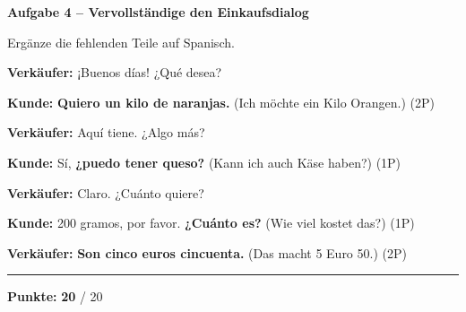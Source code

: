 \documentclass[11pt, a4paper]{article}
\newcommand{\fachfarbe}{spanisch}
\newcommand{\maxpunkte}{20}
\newcommand{\punktebox}[1]{\hfill\fbox{\small \_/#1}}
\newcommand{\lsg}[1]{\textcolor{loesung}{\textbf{#1}}}
\newenvironment{aufgabe}[1]{%
    \needspace{5\baselineskip}%
    \nopagebreak[4]%
    \vspace{10pt}
    \noindent\textbf{\textcolor{\fachfarbe}{Aufgabe #1}}
    \nopagebreak[4]%
    \vspace{5pt}
    \nopagebreak[4]%
    \begin{list}{}{\leftmargin=0pt}
    \item[]
}{%
    \end{list}
}
\begin{document}
\vspace{15pt}

\begin{aufgabe}{4 -- Vervollständige den Einkaufsdialog}
Ergänze die fehlenden Teile auf Spanisch. \punktebox{6}
\end{aufgabe}

\noindent
\textbf{Verkäufer:} ¡Buenos días! ¿Qué desea?

\vspace{0.8em}

\noindent
\textbf{Kunde:} \lsg{Quiero un kilo de naranjas.} (Ich möchte ein Kilo Orangen.) \hfill (2P)

\vspace{0.8em}

\noindent
\textbf{Verkäufer:} Aquí tiene. ¿Algo más?

\vspace{0.8em}

\noindent
\textbf{Kunde:} Sí, \lsg{¿puedo tener queso?} (Kann ich auch Käse haben?) \hfill (1P)

\vspace{0.8em}

\noindent
\textbf{Verkäufer:} Claro. ¿Cuánto quiere?

\vspace{0.8em}

\noindent
\textbf{Kunde:} 200 gramos, por favor. \lsg{¿Cuánto es?} (Wie viel kostet das?) \hfill (1P)

\vspace{0.8em}

\noindent
\textbf{Verkäufer:} \lsg{Son cinco euros cincuenta.} (Das macht 5 Euro 50.) \hfill (2P)


\vspace{20pt}
\hrule
\vspace{10pt}

\begin{flushright}
\textbf{Punkte:} \lsg{20} / \maxpunkte
\end{flushright}
\end{document}
